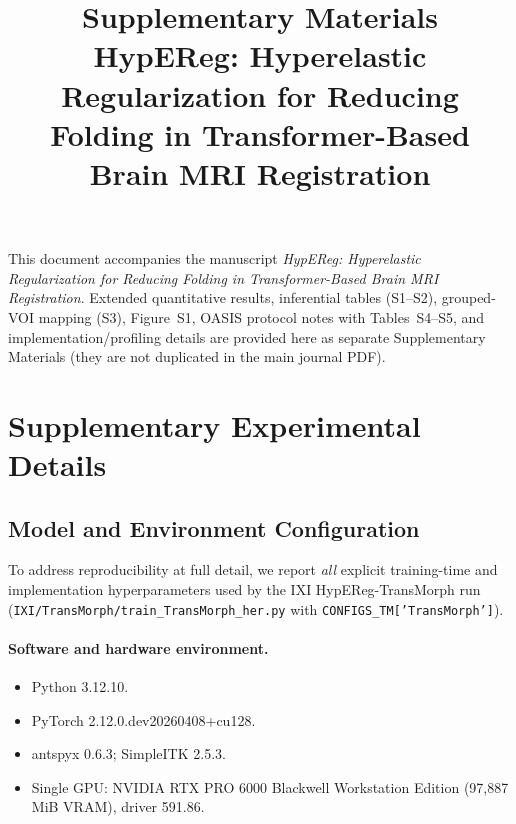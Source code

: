 \documentclass[11pt,a4paper]{article}
\title{Supplementary Materials\\HypEReg: Hyperelastic Regularization for Reducing Folding in Transformer-Based Brain MRI Registration}
\author{}
\date{}
\begin{document}
\maketitle

\noindent This document accompanies the manuscript \emph{HypEReg: Hyperelastic Regularization for Reducing Folding in Transformer-Based Brain MRI Registration}. Extended quantitative results, inferential tables (S1--S2), grouped-VOI mapping (S3), Figure~S1, OASIS protocol notes with Tables~S4--S5, and implementation/profiling details are provided here as separate Supplementary Materials (they are not duplicated in the main journal PDF).

\section{Supplementary Experimental Details}
\subsection{Model and Environment Configuration}
To address reproducibility at full detail, we report \emph{all} explicit training-time and implementation hyperparameters used by the IXI HypEReg-TransMorph run (\texttt{IXI/TransMorph/train\_TransMorph\_her.py} with \texttt{CONFIGS\_TM['TransMorph']}).

\paragraph{Software and hardware environment.}
\begin{itemize}
\item Python 3.12.10.
\item PyTorch 2.12.0.dev20260408+cu128.
\item antspyx 0.6.3; SimpleITK 2.5.3.
\item Single GPU: NVIDIA RTX PRO 6000 Blackwell Workstation Edition (97,887 MiB VRAM), driver 591.86.
\end{itemize}
\end{document}
